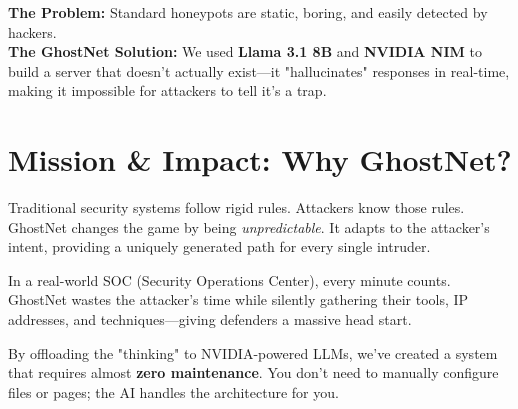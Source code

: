 \documentclass[11pt,a4paper,oneside]{article}
\begin{document}
\begin{center}
    \vspace*{0.5cm}
    \vspace{0.8cm}
\end{center}

\begin{tcolorbox}[colback=SoftGray, colframe=white, arc=3mm]
    \noindent \textbf{The Problem:} Standard honeypots are static, boring, and easily detected by hackers. \\
    \noindent \textbf{The GhostNet Solution:} We used \textbf{Llama 3.1 8B} and \textbf{NVIDIA NIM} to build a server that doesn't actually exist—it "hallucinates" responses in real-time, making it impossible for attackers to tell it's a trap.
\end{tcolorbox}

\section{Mission \& Impact: Why GhostNet?}
\begin{description}[leftmargin=1em, font=\bfseries\color{Gold}]
    \item[The Need for Adaptability:] Traditional security systems follow rigid rules. Attackers know those rules. GhostNet changes the game by being \textit{unpredictable}. It adapts to the attacker's intent, providing a uniquely generated path for every single intruder.
    \item[High-Efficiency Deception:] In a real-world SOC (Security Operations Center), every minute counts. GhostNet wastes the attacker's time while silently gathering their tools, IP addresses, and techniques—giving defenders a massive head start.
    \item[The Enterprise Edge:] By offloading the "thinking" to NVIDIA-powered LLMs, we've created a system that requires almost \textbf{zero maintenance}. You don't need to manually configure files or pages; the AI handles the architecture for you.
\end{description}
\end{document}
